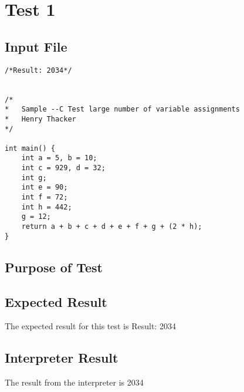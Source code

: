 \section{Test 1}
\subsection{Input File}
\begin{verbatim}
/*Result: 2034*/


/*
*	Sample --C Test large number of variable assignments
*	Henry Thacker
*/

int main() {
	int a = 5, b = 10;
	int c = 929, d = 32;
	int g;
	int e = 90;
	int f = 72;
	int h = 442;
	g = 12;
	return a + b + c + d + e + f + g + (2 * h); 
}\end{verbatim}\subsection{Purpose of Test}

\subsection{Expected Result}
The expected result for this test is Result: 2034
\subsection{Interpreter Result}
The result from the interpreter is 2034
